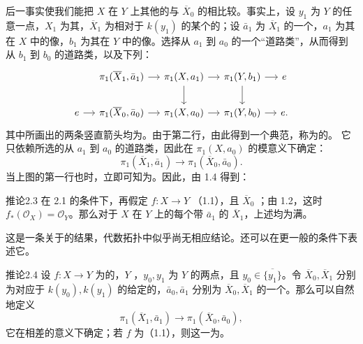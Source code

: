 后一事实使我们能把 $X$ 在 $Y$ 上其他的与 $\overline X_0$ 的相比较。事实上，设 $y_1$ 为 $Y$ 的任意一点，$X_1$ 为其，$\overline X_1$ 为相对于 $k(y_1)$ 的某个的；设 $\bar a_1$ 为 $\overline X_1$ 的一个，$a_1$ 为其在 $X$ 中的像，$b_1$ 为其在 $Y$ 中的像。选择从 $a_1$ 到 $a_0$ 的一个“道路类”，从而得到从 $b_1$ 到 $b_0$ 的道路类，以及下列：
\[
\begin{tikzcd}[column sep=small]
{} & \pi_1(\overline X_1,\bar a_1)\arrow[r] & \pi_1(X,a_1)\arrow[r]\arrow[d] & \pi_1(Y,b_1)\arrow[r]\arrow[d] &e\\
e\arrow[r]&\pi_1(\overline X_0,\bar a_0)\arrow[r]&\pi_1(X,a_0)\arrow[r]&\pi_1(Y,b_0)\arrow[r]&e.
\end{tikzcd}
\]
其中所画出的两条竖直箭头均为。由于第二行，由此得到一个典范，称为的。
它只依赖所选的从 $a_1$ 到 $a_0$ 的道路类，因此在 $\pi_1(X,a_0)$ 的模意义下确定：
\[
\pi_1(\overline X_1,\bar a_1)\longrightarrow\pi_1(\overline X_0,\bar a_0).
\]
当上图的第一行也时，立即可知为。因此，由 1.4 得到：
\begin{SGAresult}{推论}{2.3}
在 2.1 的条件下，再假定 $f:X\to Y$ （1.1），且 $\overline X_0$ ；由 1.2，这时 $f_*(\mathcal O_X)=\mathcal O_Y$。那么对于 $X$ 在 $Y$ 上的每个带 $\bar a_1$ 的 $\overline X_1$，上述均为满。
\end{SGAresult}
这是一条关于的结果，代数拓扑中似乎尚无相应结论。还可以在更一般的条件下表述它。
\begin{SGAresult}{推论}{2.4}
设 $f:X\to Y$ 为的，$Y$ ，$y_0,y_1$ 为 $Y$ 的两点，且 $y_0\in\overline{\{y_1\}}$。令 $\overline X_0,\overline X_1$ 分别为对应于 $k(y_0),k(y_1)$ 的给定的，$\bar a_0,\bar a_1$ 分别为 $\overline X_0,\overline X_1$ 的一个。那么可以自然地定义
\[
\pi_1(\overline X_1,\bar a_1)\longrightarrow\pi_1(\overline X_0,\bar a_0),
\]
它在相差的意义下确定；若 $f$ 为（1.1），则这一为。
\end{SGAresult}
